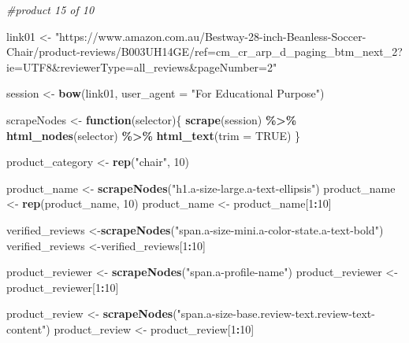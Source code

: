 \documentclass[
]{article}
\newenvironment{Shaded}{\begin{snugshade}}{\end{snugshade}}
\newcommand{\AttributeTok}[1]{\textcolor[rgb]{0.13,0.29,0.53}{#1}}
\newcommand{\CommentTok}[1]{\textcolor[rgb]{0.56,0.35,0.01}{\textit{#1}}}
\newcommand{\ConstantTok}[1]{\textcolor[rgb]{0.56,0.35,0.01}{#1}}
\newcommand{\ControlFlowTok}[1]{\textcolor[rgb]{0.13,0.29,0.53}{\textbf{#1}}}
\newcommand{\DecValTok}[1]{\textcolor[rgb]{0.00,0.00,0.81}{#1}}
\newcommand{\FunctionTok}[1]{\textcolor[rgb]{0.13,0.29,0.53}{\textbf{#1}}}
\newcommand{\NormalTok}[1]{#1}
\newcommand{\OtherTok}[1]{\textcolor[rgb]{0.56,0.35,0.01}{#1}}
\newcommand{\SpecialCharTok}[1]{\textcolor[rgb]{0.81,0.36,0.00}{\textbf{#1}}}
\newcommand{\StringTok}[1]{\textcolor[rgb]{0.31,0.60,0.02}{#1}}
\begin{document}
\begin{Shaded}
\begin{Highlighting}[]
\CommentTok{\#product 15 of 10}

\NormalTok{link01 }\OtherTok{\textless{}{-}} \StringTok{"https://www.amazon.com.au/Bestway{-}28{-}inch{-}Beanless{-}Soccer{-}Chair/product{-}reviews/B003UH14GE/ref=cm\_cr\_arp\_d\_paging\_btm\_next\_2?ie=UTF8\&reviewerType=all\_reviews\&pageNumber=2"}


\NormalTok{  session }\OtherTok{\textless{}{-}} \FunctionTok{bow}\NormalTok{(link01,}
               \AttributeTok{user\_agent =} \StringTok{"For Educational Purpose"}\NormalTok{)}

\NormalTok{  scrapeNodes }\OtherTok{\textless{}{-}} \ControlFlowTok{function}\NormalTok{(selector)\{}
    \FunctionTok{scrape}\NormalTok{(session) }\SpecialCharTok{\%\textgreater{}\%}
      \FunctionTok{html\_nodes}\NormalTok{(selector) }\SpecialCharTok{\%\textgreater{}\%}
      \FunctionTok{html\_text}\NormalTok{(}\AttributeTok{trim =} \ConstantTok{TRUE}\NormalTok{)}
\NormalTok{  \}}

\NormalTok{  product\_category }\OtherTok{\textless{}{-}} \FunctionTok{rep}\NormalTok{(}\StringTok{"chair"}\NormalTok{, }\DecValTok{10}\NormalTok{)}

\NormalTok{  product\_name }\OtherTok{\textless{}{-}} \FunctionTok{scrapeNodes}\NormalTok{(}\StringTok{"h1.a{-}size{-}large.a{-}text{-}ellipsis"}\NormalTok{)}
\NormalTok{  product\_name }\OtherTok{\textless{}{-}} \FunctionTok{rep}\NormalTok{(product\_name, }\DecValTok{10}\NormalTok{)}
\NormalTok{  product\_name }\OtherTok{\textless{}{-}}\NormalTok{ product\_name[}\DecValTok{1}\SpecialCharTok{:}\DecValTok{10}\NormalTok{]}
  
\NormalTok{  verified\_reviews }\OtherTok{\textless{}{-}}\FunctionTok{scrapeNodes}\NormalTok{(}\StringTok{"span.a{-}size{-}mini.a{-}color{-}state.a{-}text{-}bold"}\NormalTok{)}
\NormalTok{  verified\_reviews }\OtherTok{\textless{}{-}}\NormalTok{verified\_reviews[}\DecValTok{1}\SpecialCharTok{:}\DecValTok{10}\NormalTok{]}
  
\NormalTok{  product\_reviewer }\OtherTok{\textless{}{-}} \FunctionTok{scrapeNodes}\NormalTok{(}\StringTok{"span.a{-}profile{-}name"}\NormalTok{)}
\NormalTok{  product\_reviewer }\OtherTok{\textless{}{-}}\NormalTok{ product\_reviewer[}\DecValTok{1}\SpecialCharTok{:}\DecValTok{10}\NormalTok{]}
  
\NormalTok{  product\_review }\OtherTok{\textless{}{-}} \FunctionTok{scrapeNodes}\NormalTok{(}\StringTok{"span.a{-}size{-}base.review{-}text.review{-}text{-}content"}\NormalTok{)}
\NormalTok{  product\_review }\OtherTok{\textless{}{-}}\NormalTok{ product\_review[}\DecValTok{1}\SpecialCharTok{:}\DecValTok{10}\NormalTok{]}
  

\end{Highlighting}
\end{Shaded}
\end{document}
